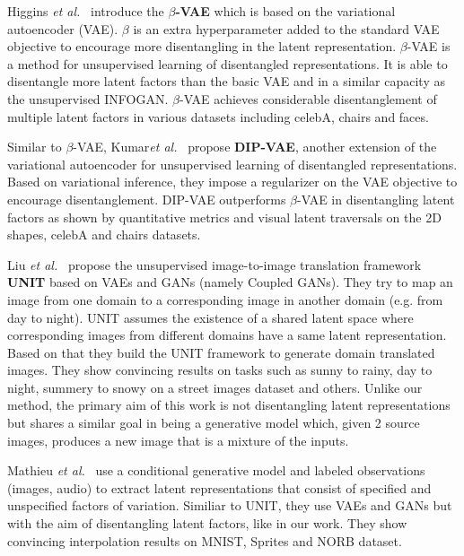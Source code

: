 \documentclass[12pt,a4paper]{article}
\begin{document}
\par Higgins \textit{et al.}~\cite{betaVAE} introduce the \textbf{$\beta$-VAE} which is based on the variational autoencoder (VAE). $\beta$ is an extra hyperparameter added to the standard VAE objective to encourage more disentangling in the latent representation. $\beta$-VAE is a method for unsupervised learning of disentangled representations. It is able to disentangle more latent factors than the basic VAE and in a similar capacity as the unsupervised INFOGAN. $\beta$-VAE achieves considerable disentanglement of multiple latent factors in various datasets including celebA, chairs and faces.

Similar to $\beta$-VAE, Kumar\textit{et al.}~\cite{DIPVAE} propose \textbf{DIP-VAE}, another extension of the variational autoencoder for unsupervised learning of disentangled representations. Based on variational inference, they impose a regularizer on the VAE objective to encourage disentanglement. DIP-VAE outperforms $\beta$-VAE in disentangling latent factors as shown by quantitative metrics and visual latent traversals on the 2D shapes, celebA and chairs datasets.

Liu \textit{et al.}~\cite{UNIT} propose the unsupervised image-to-image translation framework \textbf{UNIT} based on VAEs and GANs (namely Coupled GANs). They try to map an image from one domain to a corresponding image in another domain (e.g. from day to night). UNIT assumes the existence of a shared latent space where corresponding images from different domains have a same latent representation. Based on that they build the UNIT framework to generate domain translated images. They show convincing results on tasks such as sunny to rainy, day to night, summery to snowy on a street images dataset and others. Unlike our method, the primary aim of this work is not disentangling latent representations but shares a similar goal in being a generative model which, given 2 source images, produces a new image that is a mixture of the inputs.

Mathieu \textit{et al.}~\cite{1611.03383} use a conditional generative model and labeled observations (images, audio) to extract latent representations that consist of specified and unspecified factors of variation. Similiar to UNIT, they use VAEs and GANs but with the aim of disentangling latent factors, like in our work. They show convincing interpolation results on MNIST, Sprites and NORB dataset.
\end{document}
